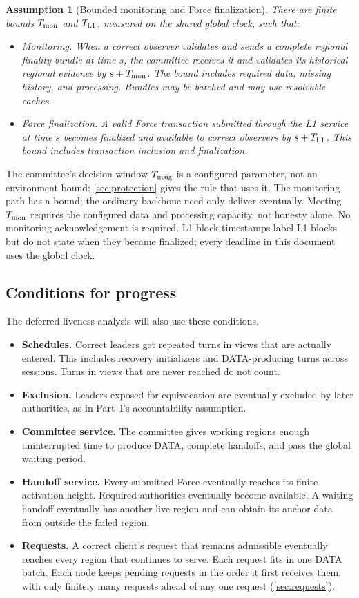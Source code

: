\documentclass[11pt,a4paper]{article}
\newtheorem{assumption}[assumption]{Assumption}
\begin{document}
\begin{assumption}[Bounded monitoring and Force finalization]
\label{ass:monitor}
There are finite bounds $T_{\rm mon}$ and $T_{\rm L1}$,
measured on the shared global clock, such that:
\begin{itemize}
\item \emph{Monitoring.} When a correct observer validates and sends a complete regional
finality bundle at time $s$, the committee receives it and validates its historical
regional evidence by $s+T_{\rm mon}$. The bound includes required data, missing history,
and processing. Bundles may be batched and may use resolvable caches.
\item \emph{Force finalization.} A valid Force transaction submitted through the L1 service at
time $s$ becomes finalized and available to correct observers by
$s+T_{\rm L1}$. This bound includes transaction inclusion and finalization.
\end{itemize}
\end{assumption}
The committee's decision window $T_{\rm msig}$ is a configured
parameter, not an environment bound; \cref{sec:protection} gives the rule
that uses it. The monitoring path has a bound; the ordinary backbone need only deliver
eventually. Meeting $T_{\rm mon}$ requires the configured data and
processing capacity, not honesty alone. No monitoring acknowledgement is
required. L1 block timestamps label L1 blocks but do not state when they
became finalized; every deadline in this document uses the global clock.

\subsection{Conditions for progress}
\label{sec:progress}
The deferred liveness analysis will also use these conditions.
\begin{itemize}
\item \textbf{Schedules.} Correct leaders get repeated turns in views
that are actually entered. This includes recovery initializers and
DATA-producing turns across sessions. Turns in views that are never
reached do not count.
\item \textbf{Exclusion.} Leaders exposed for equivocation are eventually
excluded by later authorities, as in Part~I's accountability assumption.
\item \textbf{Committee service.} The committee gives working regions
enough uninterrupted time to produce DATA, complete handoffs, and pass
the global waiting period.
\item \textbf{Handoff service.} Every submitted Force eventually reaches
its finite activation height. Required authorities eventually become
available. A waiting handoff eventually has another live region and
can obtain its anchor data from outside the failed region.
\item \textbf{Requests.} A correct client's request that remains
admissible eventually reaches every region that continues to serve.
Each request fits in one DATA batch. Each node keeps pending requests
in the order it first receives them, with only finitely many requests
ahead of any one request (\cref{sec:requests}).
\end{itemize}
\end{document}
